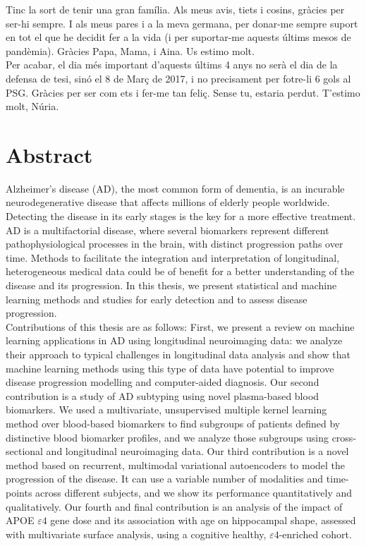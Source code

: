 \documentclass[12pt, b5paper,twoside]{tesi_upf}
\begin{document}
Tinc la sort de tenir una gran família. Als meus avis, tiets i cosins, gràcies per ser-hi sempre. I als meus pares i a la meva germana, per donar-me sempre suport en tot el que he decidit fer a la vida (i per suportar-me aquests últims mesos de pandèmia). Gràcies Papa, Mama, i Aina. Us estimo molt. \\

Per acabar, el dia més important d'aquests últims 4 anys no serà el dia de la defensa de tesi, sinó el 8 de Març de 2017, i no precisament per fotre-li 6 gols al PSG. Gràcies per ser com ets i fer-me tan feliç. Sense tu, estaria perdut. T'estimo molt, Núria. \\

\cleardoublepage


\section*{\Large \sffamily Abstract}
Alzheimer's disease (AD), the most common form of dementia, is an incurable neurodegenerative disease that affects millions of elderly people worldwide. Detecting the disease in its early stages is the key for a more effective treatment. AD is a multifactorial disease, where several biomarkers represent different pathophysiological processes in the brain, with distinct progression paths over time. Methods to facilitate the integration and interpretation of longitudinal, heterogeneous medical data could be of benefit for a better understanding of the disease and its progression. In this thesis, we present statistical and machine learning methods and studies for early detection and to assess disease progression. \\

Contributions of this thesis are as follows: First, we present a review on machine learning applications in AD using longitudinal neuroimaging data: we analyze their approach to typical challenges in longitudinal data analysis and show that machine learning methods using this type of data have potential to improve disease progression modelling and computer-aided diagnosis. Our second contribution is a study of AD subtyping using novel plasma-based blood biomarkers. We used a multivariate, unsupervised multiple kernel learning method over blood-based biomarkers to find subgroups of patients defined by distinctive blood biomarker profiles, and we analyze those subgroups using cross-sectional and longitudinal neuroimaging data. Our third contribution is a novel method based on recurrent, multimodal variational autoencoders to model the progression of the disease. It can use a variable number of modalities and time-points across different subjects, and we show its performance quantitatively and qualitatively. Our fourth and final contribution is an analysis of the impact of APOE $\varepsilon4$ gene dose and its association with age on hippocampal shape, assessed with multivariate surface analysis, using a cognitive healthy, $\varepsilon4$-enriched cohort.
\end{document}
